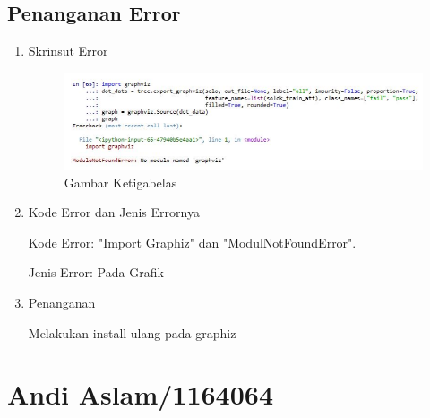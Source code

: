 \subsection{Penanganan Error}
\begin{enumerate}
\item Skrinsut Error
\begin{figure}[ht]
\centering
\includegraphics[scale=0.5]{figures/AIP/jd6.PNG}
\caption{ Gambar Ketigabelas}
\label{6}
\end{figure}
\item Kode Error dan Jenis Errornya
\par Kode Error: "Import Graphiz" dan "ModulNotFoundError". 
\par Jenis Error: Pada Grafik
\item Penanganan
\par Melakukan install ulang pada graphiz

\end{enumerate}



\section{Andi Aslam/1164064}
